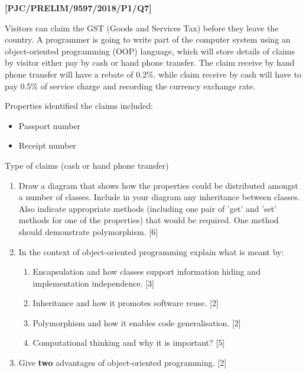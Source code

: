 \item \textbf{{[}PJC/PRELIM/9597/2018/P1/Q7{]} }

Visitors can claim the GST (Goods and Services Tax) before they leave
the country. A programmer is going to write part of the computer system
using an object-oriented programming (OOP) language, which will store
details of claims by visitor either pay by cash or hand phone transfer.
The claim receive by hand phone transfer will have a rebate of 0.2\%.
while claim receive by cash will have to pay 0.5\% of service charge
and recording the currency exchange rate. 

Properties identified the claims included: 
\begin{itemize}
\item Passport number
\item Receipt number 
\end{itemize}
Type of claims (cash or hand phone transfer)
\begin{enumerate}
\item Draw a diagram that shows how the properties could be distributed
amongst a number of classes. Include in your diagram any inheritance
between classes. Also indicate appropriate methods (including one
pair of 'get' and 'set' methods for one of the properties) that would
be required. One method should demonstrate polymorphism. {[}6{]}
\item In the context of object-oriented programming explain what is meant
by: 
\begin{enumerate}
\item Encapsulation and how classes support information hiding and implementation
independence. \hfill{} {[}3{]}
\item Inheritance and how it promotes software reuse. \hfill{}{[}2{]}
\item Polymorphism and how it enables code generalisation. \hfill{}{[}2{]}
\item Computational thinking and why it is important? \hfill{} {[}5{]}
\end{enumerate}
\item Give \textbf{two} advantages of object-oriented programming. \hfill{}{[}2{]}
\end{enumerate}